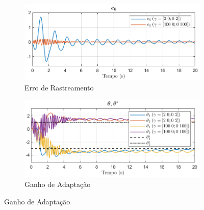\documentclass[10pt]{article}
\begin{document}
\begin{figure}[h!]
    \centering
    \begin{subfigure}[b]{0.3\textwidth}
        \centering
        \includegraphics[width=\textwidth]{img/fig02a.png}
        \caption{Erro de Rastreamento}
    \end{subfigure}
    \begin{subfigure}[b]{0.3\textwidth}
        \centering
        \includegraphics[width=\textwidth]{img/fig02b.png}
        \caption{Ganho de Adaptação}
    \end{subfigure}


\end{figure}
\end{document}
